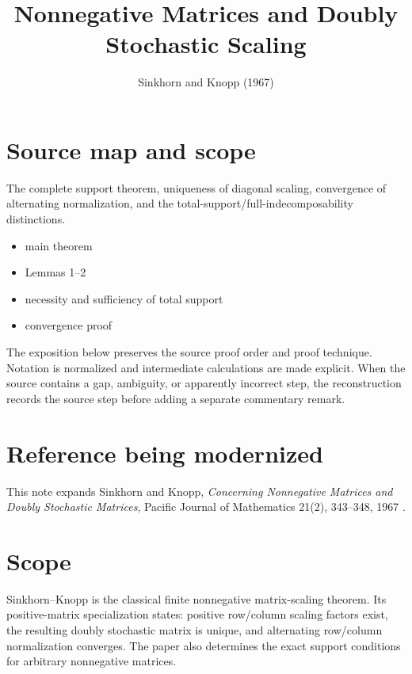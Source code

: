 
\title{Nonnegative Matrices and Doubly Stochastic Scaling}
\author{}
\date{Sinkhorn and Knopp (1967)}


\maketitle

\section*{Source map and scope}
\begin{description}[style=nextline,leftmargin=3.2cm,labelwidth=3cm]
\item[Primary source] \texttt{}
\item[Coverage] The complete support theorem, uniqueness of diagonal scaling, convergence of alternating normalization, and the total-support/full-indecomposability distinctions.
\item[Source anchors]
\begin{itemize}[leftmargin=2em]
  \item main theorem
  \item Lemmas 1--2
  \item necessity and sufficiency of total support
  \item convergence proof
\end{itemize}
\end{description}

The exposition below preserves the source proof order and proof technique.  Notation is normalized
and intermediate calculations are made explicit.  When the source contains a gap, ambiguity, or
apparently incorrect step, the reconstruction records the source step before adding a separate
commentary remark.

\section*{Reference being modernized}
This note expands Sinkhorn and Knopp, \emph{Concerning Nonnegative Matrices and Doubly Stochastic Matrices}, Pacific Journal of Mathematics 21(2), 343--348, 1967 \cite{SinkhornKnopp1967}.

\section*{Scope}
Sinkhorn--Knopp is the classical finite nonnegative matrix-scaling theorem.  Its positive-matrix specialization states: positive row/column scaling factors exist, the resulting doubly stochastic matrix is unique, and alternating row/column normalization converges.  The paper also determines the exact support conditions for arbitrary nonnegative matrices.

